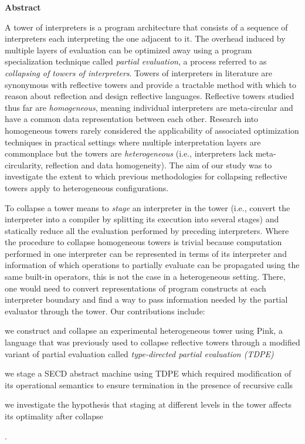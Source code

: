 \newpage
{\Huge \bf Abstract}
\vspace{24pt} 

A tower of interpreters is a program architecture that consists of a sequence of interpreters each interpreting the one adjacent to it. The overhead induced by multiple layers of evaluation can be optimized away using a program specialization technique called \textit{partial evaluation}, a process referred to as \textit{collapsing of towers of interpreters}. %
Towers of interpreters in literature are synonymous with reflective towers and provide a tractable method with which to reason about reflection and design reflective languages. Reflective towers studied thus far are \textit{homogeneous}, meaning individual interpreters are meta-circular and have a common data representation between each other.
Research into homogeneous towers rarely considered the applicability of associated optimization techniques in practical settings where multiple interpretation layers are commonplace but the towers are \textit{heterogeneous} (i.e., interpreters lack meta-circularity, reflection and data homogeneity).
The aim of our study was to investigate the extent to which previous methodologies for collapsing reflective towers apply to heterogeneous configurations.

To collapse a tower means to \textit{stage} an interpreter in the tower (i.e., convert the interpreter into a compiler by splitting its execution into several stages) and statically reduce all the evaluation performed by preceding interpreters. Where the procedure to collapse homogeneous towers is trivial because computation performed in one interpreter can be represented in terms of its interpreter and information of which operations to partially evaluate can be propagated using the same built-in operators, this is not the case in a heterogeneous setting. There, one would need to convert representations of program constructs at each interpreter boundary and find a way to pass information needed by the partial evaluator through the tower. Our contributions include:
\begin{enumerate*}[label=(\arabic*)]
    \item we construct and collapse an experimental heterogeneous tower using Pink, a language that was previously used to collapse reflective towers through a modified variant of partial evaluation called \textit{type-directed partial evaluation (TDPE)}
    \item we stage a SECD abstract machine using TDPE which required modification of its operational semantics to ensure termination in the presence of recursive calls
    \item we investigate the hypothesis that staging at different levels in the tower affects its optimality after collapse
\end{enumerate*}.

